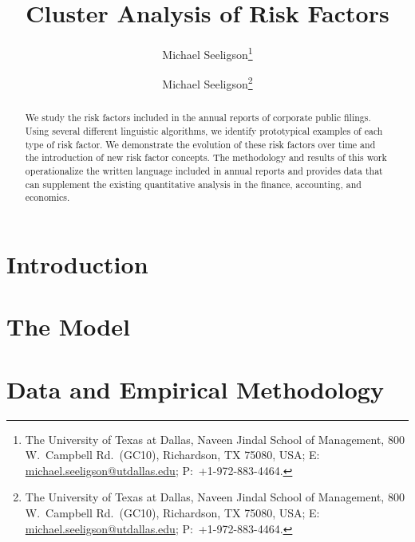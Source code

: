 \documentclass[12pt,english,draft]{article}
\title{Cluster Analysis of Risk Factors %
}
\author{
Michael Seeligson\thanks{%
	The University of Texas at Dallas, Naveen Jindal School of Management, 800
	W.~Campbell Rd.~(GC10), Richardson, TX 75080, USA; E: \href{mailto:michael.seeligson@utdallas.edu%
	}{michael.seeligson@utdallas.edu}; P:~+1-972-883-4464.}
%
\and 
%
Michael Seeligson\thanks{%
	The University of Texas at Dallas, Naveen Jindal School of Management, 800
	W.~Campbell Rd.~(GC10), Richardson, TX 75080, USA; E: \href{mailto:michael.seeligson@utdallas.edu%
	}{michael.seeligson@utdallas.edu}; P:~+1-972-883-4464.} %
}
\begin{document}

\maketitle

\begin{abstract}
We study the risk factors included in the annual reports of corporate public filings. Using several different linguistic algorithms, we identify prototypical examples of each type of risk factor. We demonstrate the evolution of these risk factors over time and the introduction of new risk factor concepts. The methodology and results of this work operationalize the written language included in annual reports and provides data that can supplement the existing quantitative analysis in the finance, accounting, and economics.  
\end{abstract}



\doublespacing
\newpage






\section*{Introduction}






\section{The Model}






\section{Data and Empirical Methodology}
\end{document}
